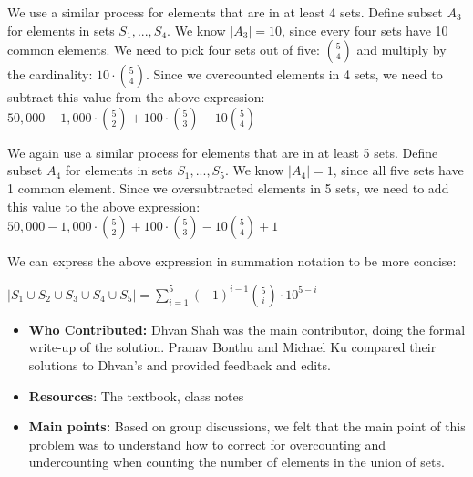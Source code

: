 \documentclass[11pt]{article}
\begin{document}
We use a similar process for elements that are in at least 4 sets. Define subset $A_3$ for elements in sets $S_1, ..., S_4$. We know $|A_3|=10$, since every four sets have 10 common elements. We need to pick four sets out of five: $\binom{5}{4}$ and multiply by the cardinality: $10 \cdot \binom{5}{4}$. Since we overcounted elements in 4 sets, we need to subtract this value from the above expression: $50,000 - 1,000 \cdot \binom{5}{2} + 100 \cdot \binom{5}{3} - 10 \binom{5}{4}$

We again use a similar process for elements that are in at least 5 sets. Define subset $A_4$ for elements in sets $S_1, ..., S_5$. We know $|A_4|=1$, since all five sets have 1 common element. Since we oversubtracted elements in 5 sets, we need to add this value to the above expression: $50,000 - 1,000 \cdot \binom{5}{2} + 100 \cdot \binom{5}{3} - 10 \binom{5}{4} + 1$

We can express the above expression in summation notation to be more concise:

$|S_1 \cup S_2 \cup S_3 \cup S_4 \cup S_5| = \sum_{i=1}^{5}(-1)^{i-1} \binom{5}{i} \cdot 10^{5 - i}$

\begin{itemize}
    \item \textbf{Who Contributed:} Dhvan Shah was the main contributor, doing the formal write-up of the solution. Pranav Bonthu and Michael Ku compared their solutions to Dhvan's and provided feedback and edits.
    \item \textbf{Resources}: The textbook, class notes
    \item \textbf{Main points:} Based on group discussions, we felt that the main point of this problem was to understand how to correct for overcounting and undercounting when counting the number of elements in the union of sets.
\end{itemize}
\end{document}
